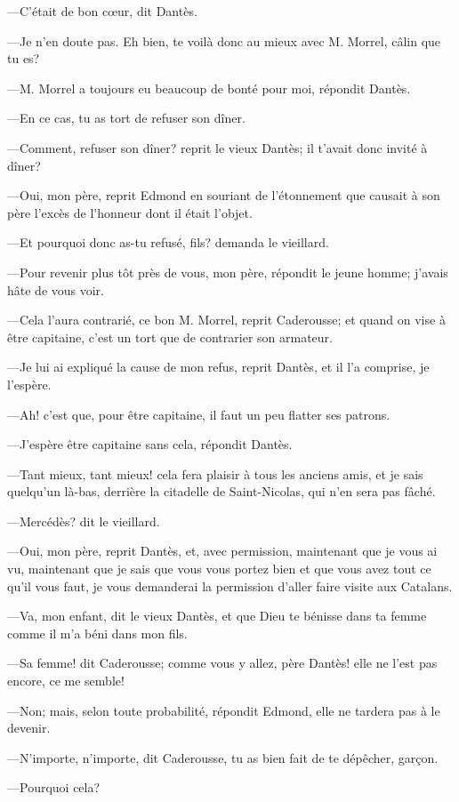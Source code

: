 —C'était de bon cœur, dit Dantès.

—Je n'en doute pas. Eh bien, te voilà donc au mieux avec M. Morrel, câlin que tu es?

—M. Morrel a toujours eu beaucoup de bonté pour moi, répondit Dantès.

—En ce cas, tu as tort de refuser son dîner.

—Comment, refuser son dîner? reprit le vieux Dantès; il t'avait donc invité à dîner?

—Oui, mon père, reprit Edmond en souriant de l'étonnement que causait à son père l'excès de l'honneur dont il était l'objet.

—Et pourquoi donc as-tu refusé, fils? demanda le vieillard.

—Pour revenir plus tôt près de vous, mon père, répondit le jeune homme; j'avais hâte de vous voir.

—Cela l'aura contrarié, ce bon M. Morrel, reprit Caderousse; et quand on vise à être capitaine, c'est un tort que de contrarier son armateur.

—Je lui ai expliqué la cause de mon refus, reprit Dantès, et il l'a comprise, je l'espère.

—Ah! c'est que, pour être capitaine, il faut un peu flatter ses patrons.

—J'espère être capitaine sans cela, répondit Dantès.

—Tant mieux, tant mieux! cela fera plaisir à tous les anciens amis, et je sais quelqu'un là-bas, derrière la citadelle de Saint-Nicolas, qui n'en sera pas fâché.

—Mercédès? dit le vieillard.

—Oui, mon père, reprit Dantès, et, avec permission, maintenant que je vous ai vu, maintenant que je sais que vous vous portez bien et que vous avez tout ce qu'il vous faut, je vous demanderai la permission d'aller faire visite aux Catalans.

—Va, mon enfant, dit le vieux Dantès, et que Dieu te bénisse dans ta femme comme il m'a béni dans mon fils.

—Sa femme! dit Caderousse; comme vous y allez, père Dantès! elle ne l'est pas encore, ce me semble!

—Non; mais, selon toute probabilité, répondit Edmond, elle ne tardera pas à le devenir.

—N'importe, n'importe, dit Caderousse, tu as bien fait de te dépêcher, garçon.

—Pourquoi cela?

